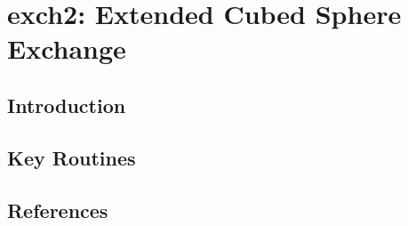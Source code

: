 


\section{exch2: Extended Cubed Sphere Exchange}

\subsection{Introduction}







\subsection{Key Routines}



\subsection{References}
